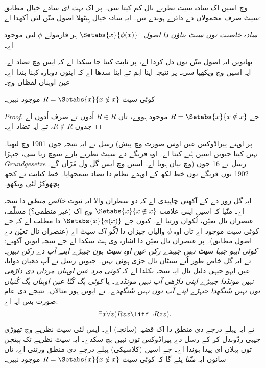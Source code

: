 \documentclass[../../../include/open-logic-section]{subfiles}
\begin{document}

 وچ اسیں اک سادہ سیٹ نظریے نال کم کیتا سی۔ پر اک
\emph{بہت ای} سادے خیال مطابق سیٹ صرف محمولاں دے دائرے ہوندے نیں۔ ایہ سادہ خیال ہِیٹھلا اصول منّن
لئی آکھدا اے:

\begin{defish}
  \emph{سادہ خاصیت توں سیٹ بناؤن دا اصول۔} $\Setabs{x}{\phi(x)}$ ہر فارمولے $\phi$ لئی موجود اے۔
\end{defish}

بھانویں ایہ اصول منّن نوں دل کردا اے، پر ثابت کیتا جا سکدا اے کہ ایس
وچ تضاد اے۔ ایہ اسیں  وچ ویکھیا سی۔ پر نتیجہ اینا
اہم تے اینا سدھا اے کہ اینوں دوبارہ کہنا بندا اے۔ عین اوہناں لفظاں وچ۔

\begin{thm}
کوئی سیٹ $R = \Setabs{x}{x \notin x}$ موجود نہیں۔
\end{thm}

\begin{proof}
جے $R = \Setabs{x}{x \notin x}$ موجود ہووے، تاں
$R \in R$ اُدوں تے صرف اُدوں اے جدوں $R \notin R$، تے ایہ تضاد اے۔
\end{proof}

رسل نے ایہ نتیجہ جون 1901 وچ لبھیا۔ (پر اوہنے پیراڈوکس عین اوس صورت وچ
پیش نہیں کیتا جیویں اسیں ہُنے کیتا اے۔ اوہ فریگے دے سیٹ نظریے بارے سوچ ریا سی،
جیہڑا \emph{Grundgesetze} وچ بیان ہویا اے۔ اسیں  وچ ایس گل
ول مُڑاں گے۔) رسل نے 16 جون 1902 نوں فریگے نوں خط لکھ کے اوہدے نظام دا
تضاد سمجھایا۔ خط کتابت تے کجھ پچھوکڑ لئی \citet[pp.~124--8]{Heijenoort1967} ویکھو۔

ایہ گل زور دے کے آکھنی چاہیدی اے کہ دو سطراں والا ایہ ثبوت \emph{خالص منطق}
دا نتیجہ اے۔ منّیا کہ اسیں اپنی علامت $\Setabs{x}{x \notin x}$ وچ اک
(غیر منطقی؟) مسلّمہ، عنصراں نال تعیّن، لُکواں ورتیا اے۔ کیوں جے
$\Setabs{x}{\phi(x)}$ دا مطلب اے کہ جے کوئی سیٹ موجود اے تاں اوہ $\phi$
والیاں چیزاں دا \emph{اکّو اک} سیٹ اے (عنصراں نال تعیّن دے اصول مطابق)۔
پر عنصراں نال تعیّن دا اشارہ وی ہٹ سکدا اے جے نتیجہ ایویں آکھیے:
\emph{کوئی ایہو جیہا سیٹ نہیں جیہدے رکن عین اوہ سیٹ ہون جیہڑے اپنے آپ دے رکن نہیں}۔
تے ایہ گل خاص طور اُتے سیٹاں نال جڑی ہوئی نہیں۔ جیویں رسل نے آپ دھیان دوایا،
عین ایہو جیہی دلیل نال ایہ نتیجہ نکلدا اے کہ \emph{کوئی مرد عین اوہناں
مرداں دی داڑھی نہیں مونڈدا جیہڑے اپنی داڑھی آپ نہیں مونڈدے}۔ یا
\emph{کوئی پگ کُتّا عین اوہناں پگ کُتیاں نوں نہیں سُنگھدا جیہڑے اپنے آپ نوں
نہیں سُنگھدے}۔ تے ایویں ہور مثالاں۔ نتیجے دی عام صورت بس ایہ اے:
\[
\lnot \exists x \forall z(Rzx \liff \lnot R zz).
\]
تے ایہ پہلے درجے دی منطق دا اک قضیہ (سانچہ) اے۔ ایس لئی سیٹ نظریے وچ
تھوڑی جیہی ردّوبدل کر کے رسل دے پیراڈوکس توں نہیں بچ سکدے۔ ایہ سیٹ نظریے
تک \emph{پہنچن} توں پہلاں ای پیدا ہوندا اے۔ جے اسیں (کلاسیکی) پہلے درجے دی
منطق ورتنی اے، تاں سانوں ایہ \emph{منّنا} پئے گا کہ کوئی سیٹ $R = \Setabs{x}{x\notin x}$ موجود نہیں۔
\end{document}
